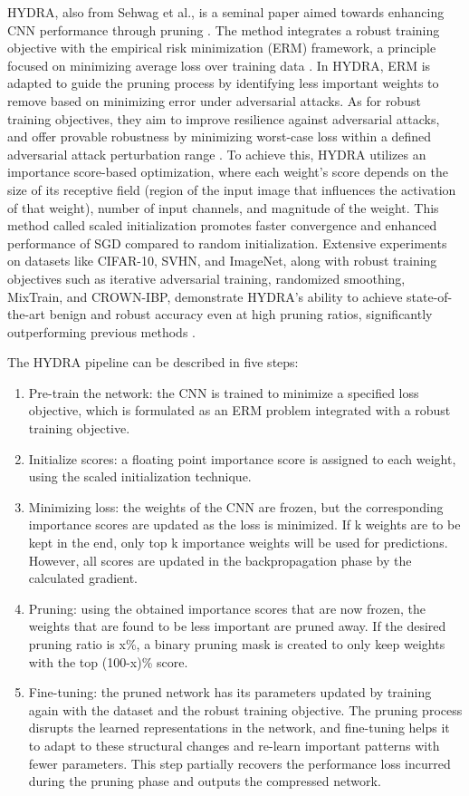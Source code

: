 \documentclass[journal,onecolumn,12pt]{IEEEtran}
\begin{document}
HYDRA, also from Sehwag et al., is a seminal paper aimed towards enhancing CNN performance through pruning \cite{hydra}. The method integrates a robust training objective with the empirical risk minimization (ERM) framework, a principle focused on minimizing average loss over training data \cite{erm}. In HYDRA, ERM is adapted to guide the pruning process by identifying less important weights to remove based on minimizing error under adversarial attacks. As for robust training objectives, they aim to improve resilience against adversarial attacks, and offer provable robustness by minimizing worst-case loss within a defined adversarial attack perturbation range \cite{mixtrain}. To achieve this, HYDRA utilizes an importance score-based optimization, where each weight's score depends on the size of its receptive field (region of the input image that influences the activation of that weight), number of input channels, and magnitude of the weight. This method called scaled initialization promotes faster convergence and enhanced performance of SGD compared to random initialization. Extensive experiments on datasets like CIFAR-10, SVHN, and ImageNet, along with robust training objectives such as iterative adversarial training, randomized smoothing, MixTrain, and CROWN-IBP, demonstrate HYDRA's ability to achieve state-of-the-art benign and robust accuracy even at high pruning ratios, significantly outperforming previous methods \cite{CIFAR, SVHN, imagenet, randsmooth, mixtrain, crownibp}.

The HYDRA pipeline can be described in five steps:
\begin{enumerate}
    \item Pre-train the network: the CNN is trained to minimize a specified loss objective, which is formulated as an ERM problem integrated with a robust training objective.
    \item Initialize scores: a floating point importance score is assigned to each weight, using the scaled initialization technique. 
    \item Minimizing loss: the weights of the CNN are frozen, but the corresponding importance scores are updated as the loss is minimized. If k weights are to be kept in the end, only top k importance weights will be used for predictions. However, all scores are updated in the backpropagation phase by the calculated gradient.
    \item Pruning: using the obtained importance scores that are now frozen, the weights that are found to be less important are pruned away. If the desired pruning ratio is x\%, a binary pruning mask is created to only keep weights with the top (100-x)\% score. 
    \item Fine-tuning: the pruned network has its parameters updated by training again with the dataset and the robust training objective. The pruning process disrupts the learned representations in the network, and fine-tuning helps it to adapt to these structural changes and re-learn important patterns with fewer parameters. This step partially recovers the performance loss incurred during the pruning phase and outputs the compressed network. 
\end{enumerate}
\end{document}
